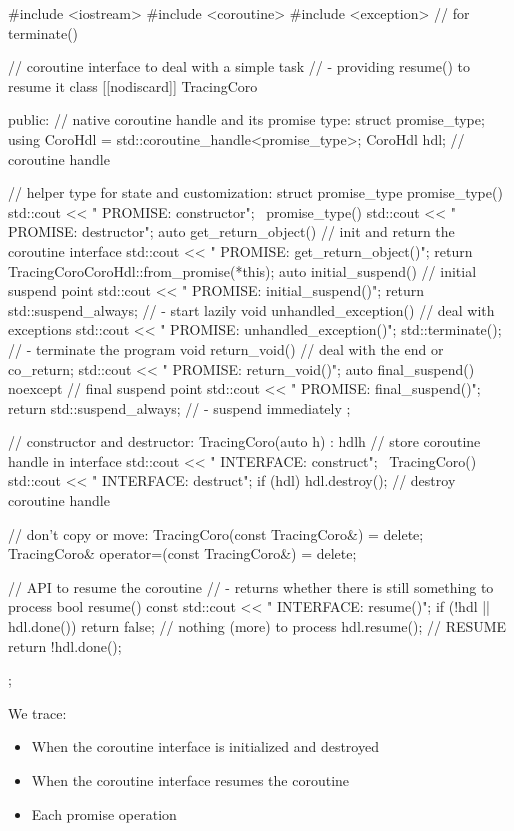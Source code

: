 \begin{cpp}
#include <iostream>
#include <coroutine>
#include <exception> // for terminate()

// coroutine interface to deal with a simple task
// - providing resume() to resume it
class [[nodiscard]] TracingCoro {
	public:
	// native coroutine handle and its promise type:
	struct promise_type;
	using CoroHdl = std::coroutine_handle<promise_type>;
	CoroHdl hdl; // coroutine handle
	
	// helper type for state and customization:
	struct promise_type {
		promise_type() {
			std::cout << " PROMISE: constructor\n";
		}
		~promise_type() {
			std::cout << " PROMISE: destructor\n";
		}
		auto get_return_object() { // init and return the coroutine interface
			std::cout << " PROMISE: get_return_object()\n";
			return TracingCoro{CoroHdl::from_promise(*this)};
		}
		auto initial_suspend() { // initial suspend point
			std::cout << " PROMISE: initial_suspend()\n";
			return std::suspend_always{}; // - start lazily
		}
		void unhandled_exception() { // deal with exceptions
			std::cout << " PROMISE: unhandled_exception()\n";
			std::terminate(); // - terminate the program
		}
		void return_void() { // deal with the end or co_return;
			std::cout << " PROMISE: return_void()\n";
		}
		auto final_suspend() noexcept { // final suspend point
			std::cout << " PROMISE: final_suspend()\n";
			return std::suspend_always{}; // - suspend immediately
		}
	};
	
	// constructor and destructor:
	TracingCoro(auto h)
	: hdl{h} { // store coroutine handle in interface
	std::cout << " INTERFACE: construct\n";
	}
	~TracingCoro() {
		std::cout << " INTERFACE: destruct\n";
		if (hdl) {
			hdl.destroy(); // destroy coroutine handle
		}
	}
	
	// don’t copy or move:
	TracingCoro(const TracingCoro&) = delete;
	TracingCoro& operator=(const TracingCoro&) = delete;
	
	// API to resume the coroutine
	// - returns whether there is still something to process
	bool resume() const {
		std::cout << " INTERFACE: resume()\n";
		if (!hdl || hdl.done()) {
			return false; // nothing (more) to process
		}
		hdl.resume(); // RESUME
		return !hdl.done();
	}
};
\end{cpp}

We trace:

\begin{itemize}
\item 
When the coroutine interface is initialized and destroyed

\item 
When the coroutine interface resumes the coroutine

\item 
Each promise operation
\end{itemize}


